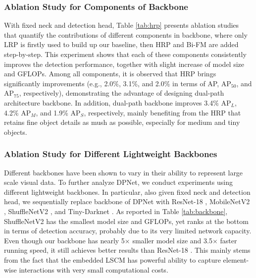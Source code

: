 \documentclass[lettersize,journal]{IEEEtran}
\begin{document}
\subsubsection{Ablation Study for Components of Backbone}
With fixed neck and detection head, Table \ref{tab:hrp} presents ablation studies that quantify the contributions of different components in backbone, where only LRP is firstly used to build up our baseline, then HRP and Bi-FM are added step-by-step. This experiment shows that each of these components consistently improves the detection performance, together with slight increase of model size and GFLOPs. Among all components, it is observed that HRP brings significantly improvements (e.g., 2.0\%, 3.1\%, and 2.0\% in terms of AP, AP$_{50}$, and AP$_{75}$, respectively), demonstrating the advantage of designing dual-path architecture backbone. In addition, dual-path backbone improves 3.4\% AP$_L$, 4.2\% AP$_M$, and 1.9\% AP$_S$, respectively, mainly benefiting from the HRP that retains fine object details as mush as possible, especially for medium and tiny objects.



\subsubsection{Ablation Study for Different Lightweight Backbones}
Different backbones have been shown to vary in their ability to represent large scale visual data. To further analyze DPNet, we conduct experiments using different lightweight backbones. In particular, also given fixed neck and detection head, we sequentially replace backbone of DPNet with ResNet-18 \cite{resnet}, MobileNetV2 \cite{sandler2018mobilenetv2}, ShuffleNetV2 \cite{ma2018shufflenet}, and Tiny-Darknet \cite{redmon2018yolov3}. As reported in Table \ref{tab:backbone}, ShuffleNetV2 \cite{ma2018shufflenet} has the smallest model size and GFLOPs, yet ranks at the bottom in terms of detection accuracy, probably due to its very limited network capacity. Even though our backbone has nearly 5$\times$ smaller model size and 3.5$\times$ faster running speed, it still achieves better results than ResNet-18 \cite{resnet}. This mainly stems from the fact that the embedded LSCM has powerful ability to capture element-wise interactions with very small computational costs.
\end{document}
